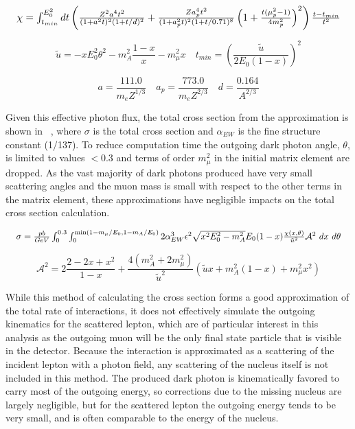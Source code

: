 \begin{equation}
    \label{eq:chi}
    \resizebox{\textwidth}{!}{
    $\chi = \int^{E_0^2}_{t_{min}} dt \left( \frac{Z^2a^4t^2}{(1+a^2t)^2(1+t/d)^2}+\frac{Za_p^4t^2}{(1+a_p^2t)^2(1+t/0.71)^8}\left(1+\frac{t(\mu_p^2-1)}{4m_p^2}\right)^2\right)\frac{t-t_{min}}{t^2}$
    }
\end{equation}	

\begin{equation}
	\label{eq:utilde}
	\tilde{u} = -xE_0^2\theta^2 - m_A^2\frac{1-x}{x} - m_\mu^2x
	\quad
	t_{min} = \left(\frac{\tilde{u}}{2E_0(1-x)}\right)^2
\end{equation}

\begin{equation}
	\label{eq:adefs}
	a = \frac{111.0}{m_e Z^{1/3}}
	\quad
	a_p = \frac{773.0}{m_e Z^{2/3}}
	\quad
	d = \frac{0.164}{A^{2/3}}
\end{equation}

Given this effective photon flux, the total cross section from the \ww approximation is shown in ~\cite{Bjorken_2009}, where $\sigma$ is the total cross section and $\alpha_{EW}$ is the fine structure constant (1/137).
To reduce computation time the outgoing dark photon angle, $\theta$, is limited to values $<$0.3 and terms of order $m_\mu^2$ in the initial matrix element are dropped.
As the vast majority of dark photons produced have very small scattering angles and the muon mass is small with respect to the other terms in the matrix element, these approximations have negligible impacts on the total cross section calculation.

\begin{equation}
    \resizebox{\textwidth}{!}{
    $
	    \sigma = \frac{pb}{GeV} \int_0^{0.3} \int_0^{\min(1-m_\mu/E_0,1-m_A/E_0)} 2 \alpha_{EW}^3\epsilon^2 \sqrt{x^2E_0^2 - m_A^2}E_0(1-x) 
		\frac{\chi(x,\theta)}{\tilde{u}^2} \mathcal{A}^2
~dx~d\theta
    $
    }
    \label{eq:fullCX}
\end{equation}

\begin{equation}
	\label{eq:afunc}
	\mathcal{A}^2 = 2\frac{2-2x+x^2}{1-x}+\frac{4(m_A^2+2m_\mu^2)}{\tilde{u}^2}(\tilde{u}x + m_A^2(1-x) + m_\mu^2x^2)
\end{equation}

While this method of calculating the cross section forms a good approximation of the total rate of \dbrem interactions, it does not effectively simulate the outgoing kinematics for the scattered lepton, which are of particular interest in this analysis as the outgoing muon will be the only final state particle that is visible in the detector.
Because the interaction is approximated as a scattering of the incident lepton with a photon field, any scattering of the nucleus itself is not included in this method.
The produced dark photon is kinematically favored to carry most of the outgoing energy, so corrections due to the missing nucleus are largely negligible, but for the scattered lepton the outgoing energy tends to be very small, and is often comparable to the energy of the nucleus.

